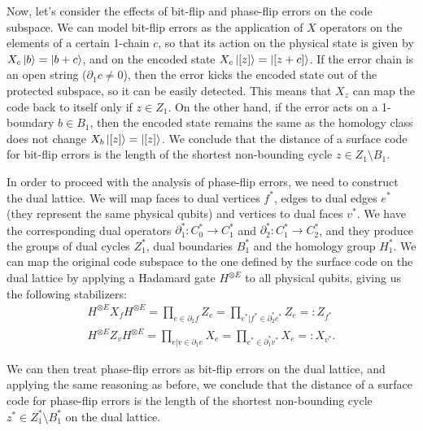 \documentclass[12pt, twoside, openany]{book}
\begin{document}
Now, let's consider the effects of bit-flip and phase-flip errors on the code subspace. We can model bit-flip errors as the application of $X$ operators on the elements of a certain 1-chain $c$, so that its action on the physical state is given by $X_c \ket{b} = \ket{b + c}$, and on the encoded state $X_c \ket{[z]} = \ket{[z + c]}$. If the error chain is an open string ($\partial_1 c \neq 0$), then the error kicks the encoded state out of the protected subspace, so it can be easily detected. This means that $X_z$ can map the code back to itself only if $z \in Z_1$. On the other hand, if the error acts on a 1-boundary $b \in B_1$, then the encoded state remains the same as the homology class does not change $X_b \ket{[z]} = \ket{[z]}$. We conclude that the distance of a surface code for bit-flip errors is the length of the shortest non-bounding cycle $z \in Z_1 \setminus B_1$. 

In order to proceed with the analysis of phase-flip errors, we need to construct the dual lattice. We will map faces to dual vertices $f^*$, edges to dual edges $e^*$ (they represent the same physical qubits) and vertices to dual faces $v^*$. We have the corresponding dual operators $\partial^*_1 : C^*_0 \rightarrow C^*_1$ and $\partial^*_2 : C^*_1 \rightarrow C^*_2$, and they produce the groups of dual cycles $Z^*_1$, dual boundaries $B^*_1$ and the homology group $H^*_1$. We can map the original code subspace to the one defined by the surface code on the dual lattice by applying a Hadamard gate $H^{\otimes E}$ to all physical qubits, giving us the following stabilizers:
\begin{align}
    H^{\otimes E} X_f H^{\otimes E} = \prod_{e \in \partial_2 f} Z_e = \prod_{e^* | f^* \in \partial_2^* e^*} Z_e =: Z_{f^*} \\
H^{\otimes E} Z_v H^{\otimes E} = \prod_{e | v \in \partial_1 e} X_e = \prod_{e^* \in \partial_1^* v^*} X_e =: X_{v^*}.
\end{align}

We can then treat phase-flip errors as bit-flip errors on the dual lattice, and applying the same reasoning as before, we conclude that the distance of a surface code for phase-flip errors is the length of the shortest non-bounding cycle $z^* \in Z^*_1 \setminus B^*_1$ on the dual lattice. 
\end{document}
